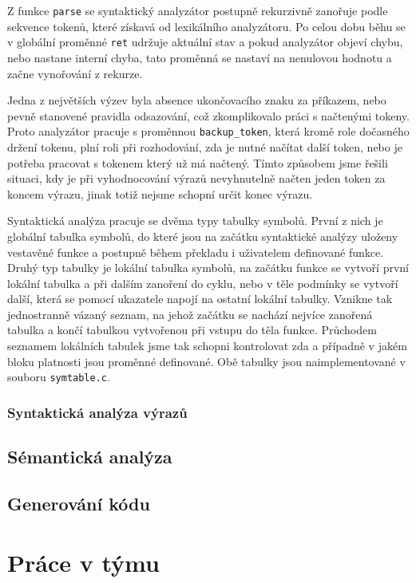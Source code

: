 \documentclass[11pt]{article}
\begin{document}
 Z funkce \texttt{parse} se 
 syntaktický analyzátor postupně rekurzivně zanořuje podle sekvence tokenů, které získavá od lexikálního analyzátoru. Po celou 
 dobu běhu se v globální proměnné \texttt{ret} udržuje aktuální stav a pokud analyzátor objeví chybu, nebo nastane interní chyba, 
 tato proměnná se nastaví na nenulovou hodnotu a začne vynořování z rekurze. 

 Jedna z největších výzev byla absence ukončovacího 
 znaku za příkazem, nebo pevně stanovené pravidla odsazování, což zkomplikovalo práci s načtenými tokeny. Proto analyzátor pracuje 
 s proměnnou \texttt{backup\_token}, která kromě role dočasného držení tokenu, plní roli při rozhodování, zda je nutné načítat 
 další token, nebo je potřeba pracovat s tokenem který už má načtený. Tímto způsobem jsme řešili situaci, kdy je při 
 vyhodnocování výrazů nevyhnutelně načten jeden token za koncem výrazu, jinak totiž nejsme schopní určit konec výrazu. 
 
 Syntaktická analýza pracuje se dvěma typy tabulky symbolů. První z nich je globální tabulka symbolů, do které jsou na začátku 
 syntaktické analýzy uloženy vestavěné funkce a postupně během překladu i uživatelem definované funkce. Druhý typ tabulky je lokální 
 tabulka symbolů, na začátku funkce se vytvoří první lokální tabulka a při dalším zanoření do cyklu, nebo v těle podmínky se vytvoří 
 další, která se pomocí ukazatele napojí na ostatní lokální tabulky. Vznikne tak jednostranně vázaný seznam, na jehož začátku se nachází 
 nejvíce zanořená tabulka a končí tabulkou vytvořenou při vstupu do těla funkce. Průchodem seznamem lokálních tabulek jsme tak 
 schopni kontrolovat zda a případně v jakém bloku platnosti jsou proměnné definované. Obě tabulky jsou naimplementované v souboru
 \texttt{symtable.c}.

\subsubsection{Syntaktická analýza výrazů}

\subsection{Sémantická analýza}

\subsection{Generování kódu}

\section{Práce v týmu}
\end{document}
